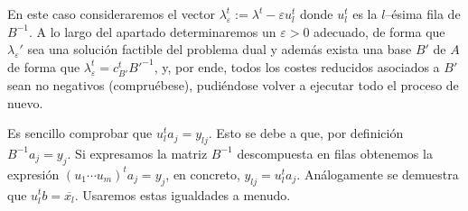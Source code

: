 En este caso consideraremos el vector $\lambda_\varepsilon^t:=\lambda^t-\varepsilon u_l^t$ donde $u_l^t$ es la $l$--ésima fila de $B^{-1}$. A lo largo del apartado determinaremos un $\varepsilon>0$ adecuado, de forma que $\lambda_\varepsilon'$ sea una solución factible del problema dual y además exista una base $B'$ de $A$ de forma que $\lambda_\varepsilon^t=c_{B'}^tB'^{-1}$, y, por ende, todos los costes reducidos asociados a $B'$ sean no negativos (compruébese), pudiéndose volver a ejecutar todo el proceso de nuevo.
\begin{obs}
	Es sencillo comprobar que $u_l^ta_j=y_{lj}$. Esto se debe a que, por definición $B^{-1}a_j=y_j$. Si expresamos la matriz $B^{-1}$ descompuesta en filas obtenemos la expresión $(u_1\cdots u_m)^ta_j=y_j$, en concreto, $y_{lj}=u_l^ta_j$. Análogamente se demuestra que $u_l^tb=\overline{x_l}$. Usaremos estas igualdades a menudo.
\end{obs}

